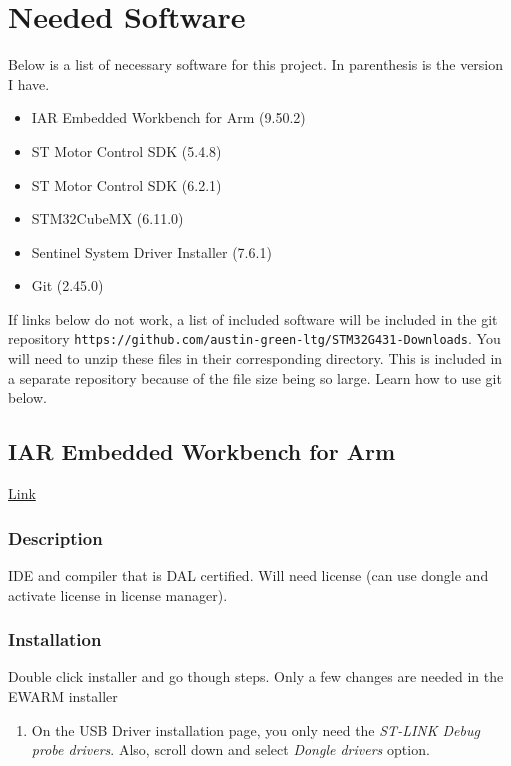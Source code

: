 \documentclass[10pt]{article}
\begin{document}
	\FloatBarrier \section{Needed Software}
        Below is a list of necessary software for this project. In parenthesis is the version I have.
        \begin{itemize}
            \item IAR Embedded Workbench for Arm (9.50.2)
            \item ST Motor Control SDK (5.4.8)
            \item ST Motor Control SDK (6.2.1)
            \item STM32CubeMX (6.11.0)
            \item Sentinel System Driver Installer (7.6.1)
            \item Git (2.45.0)
        \end{itemize}
        If links below do not work, a list of included software will be included in the git repository \texttt{https://github.com/austin-green-ltg/STM32G431-Downloads}.  You will need to unzip these files in their corresponding directory. This is included in a separate repository because of the file size being so large. Learn how to use git below.
		\FloatBarrier \subsection{IAR Embedded Workbench for Arm}
            \href{https://www.iar.com/products/architectures/arm/iar-embedded-workbench-for-arm/}{Link}
			\FloatBarrier \subsubsection{Description}
                IDE and compiler that is DAL certified. Will need license (can use dongle and activate license in license manager).
			\FloatBarrier \subsubsection{Installation}
                Double click installer and go though steps. Only a few changes are needed in the EWARM installer
                \begin{enumerate}
                    \item On the USB Driver installation page, you only need the \emph{ST-LINK Debug probe drivers}. Also, scroll down and select \emph{Dongle drivers} option.
                \end{enumerate}
\end{document}
